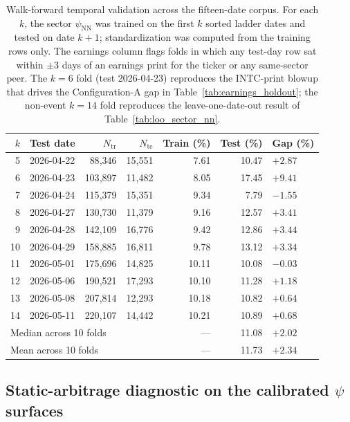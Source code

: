 \begin{table}[ht]
\centering
\caption{Walk-forward temporal validation across the fifteen-date corpus. For each $k$, the sector $\psi_{\text{NN}}$ was trained on the first $k$ sorted ladder dates and tested on date $k+1$; standardization was computed from the training rows only. The earnings column flags folds in which any test-day row sat within $\pm 3$ days of an earnings print for the ticker or any same-sector peer. The $k = 6$ fold (test 2026-04-23) reproduces the INTC-print blowup that drives the Configuration-A gap in Table~\ref{tab:earnings_holdout}; the non-event $k = 14$ fold reproduces the leave-one-date-out result of Table~\ref{tab:loo_sector_nn}.}\label{tab:walk_forward}
\begin{tabular}{rlrrrrl}
\toprule
$k$ & Test date & $N_{\text{tr}}$ & $N_{\text{te}}$ & Train (\%) & Test (\%) & Gap (\%) \\
\midrule
 5 & 2026-04-22 &  88{,}346 & 15{,}551 &  7.61 & 10.47 & $+2.87$ \\
 6 & 2026-04-23 & 103{,}897 & 11{,}482 &  8.05 & 17.45 & $+9.41$ \\
 7 & 2026-04-24 & 115{,}379 & 15{,}351 &  9.34 &  7.79 & $-1.55$ \\
 8 & 2026-04-27 & 130{,}730 & 11{,}379 &  9.16 & 12.57 & $+3.41$ \\
 9 & 2026-04-28 & 142{,}109 & 16{,}776 &  9.42 & 12.86 & $+3.44$ \\
10 & 2026-04-29 & 158{,}885 & 16{,}811 &  9.78 & 13.12 & $+3.34$ \\
11 & 2026-05-01 & 175{,}696 & 14{,}825 & 10.11 & 10.08 & $-0.03$ \\
12 & 2026-05-06 & 190{,}521 & 17{,}293 & 10.10 & 11.28 & $+1.18$ \\
13 & 2026-05-08 & 207{,}814 & 12{,}293 & 10.18 & 10.82 & $+0.64$ \\
14 & 2026-05-11 & 220{,}107 & 14{,}442 & 10.21 & 10.89 & $+0.68$ \\
\midrule
\multicolumn{4}{l}{Median across 10 folds}    & --- & 11.08 & $+2.02$ \\
\multicolumn{4}{l}{Mean   across 10 folds}    & --- & 11.73 & $+2.34$ \\
\bottomrule
\end{tabular}
\end{table}

\subsection{Static-arbitrage diagnostic on the calibrated $\psi$ surfaces}\label{sec:supp_static_arb}

